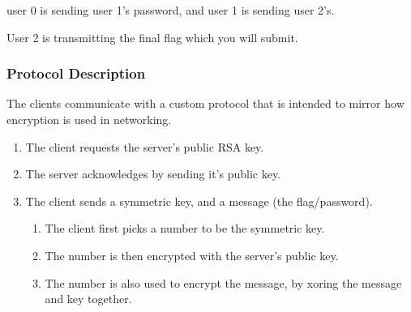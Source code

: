 {user 0 is sending user 1's password, and user 1 is sending user 2's. %



User 2 is transmitting the final flag which you will submit. 







                \subsubsection*{Protocol Description}



                    The clients communicate with a custom protocol that is intended to mirror how encryption is used in networking. 



                    \begin{enumerate}



                        \item The client requests the server's public RSA key.



                        \item The server acknowledges by sending it's public key.



                        \item The client sends a symmetric key, and a message (the flag/password).



                        \begin{enumerate}[1.]



                            \item The client first picks a number to be the symmetric key.



                            \item The number is then encrypted with the server's public key.



                            \item The number is also used to encrypt the message, by xoring the message and key together.



                            \begin{itemize}




\end{itemize}
\end{enumerate}
\end{enumerate}}
